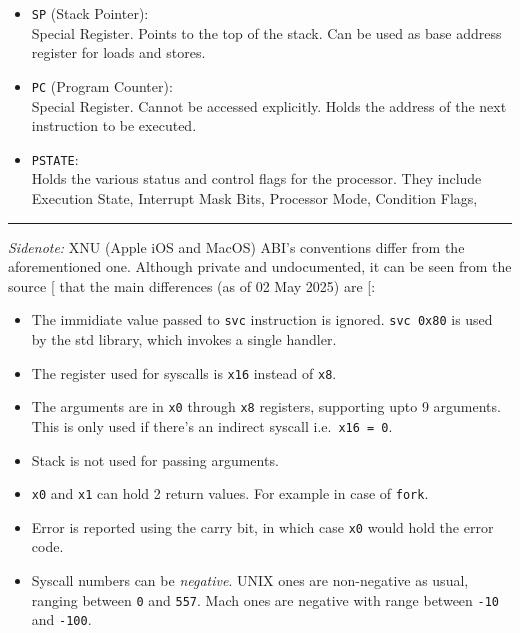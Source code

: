 \documentclass[a4paper, nobind]{templates/ociamthesis}
\providecommand{\tightlist}{%
  \setlength{\itemsep}{0pt}\setlength{\parskip}{0pt}}
\begin{document}
\begin{itemize}
  (Non-volatile) Holds the return address of a function call.
  Can be used, but value must be restored before returning.
\item
  \texttt{SP} (Stack Pointer):\\
  Special Register. Points to the top of the stack.
  Can be used as base address register for loads and stores.
\item
  \texttt{PC} (Program Counter):\\
  Special Register. Cannot be accessed explicitly.
  Holds the address of the next instruction to be executed.
\item
  \texttt{PSTATE}:\\
  Holds the various status and control flags for the processor.
  They include Execution State, Interrupt Mask Bits, Processor Mode, Condition Flags,
\end{itemize}

\begin{center}\rule{0.5\linewidth}{0.5pt}\end{center}

\emph{Sidenote:} XNU (Apple iOS and MacOS) ABI's conventions differ from the aforementioned one.
Although private and undocumented, it can be seen from the source {[}\citeproc{ref-apple-oss}{31}{]} that
the main differences (as of 02 May 2025) are {[}\citeproc{ref-so-xnu-abi}{51}{]}:

\begin{itemize}
\tightlist
\item
  The immidiate value passed to \texttt{svc} instruction is ignored. \texttt{svc\ 0x80} is used
  by the std library, which invokes a single handler.
\item
  The register used for syscalls is \texttt{x16} instead of \texttt{x8}.
\item
  The arguments are in \texttt{x0} through \texttt{x8} registers, supporting upto 9 arguments.
  This is only used if there's an indirect syscall i.e.~\texttt{x16\ =\ 0}.
\item
  Stack is not used for passing arguments.
\item
  \texttt{x0} and \texttt{x1} can hold 2 return values. For example in case of \texttt{fork}.
\item
  Error is reported using the carry bit, in which case \texttt{x0} would hold
  the error code.
\item
  Syscall numbers can be \emph{negative}.
  UNIX ones are non-negative as usual, ranging between \texttt{0} and \texttt{557}.
  Mach ones are negative with range between \texttt{-10} and \texttt{-100}.
\end{itemize}
\end{document}
